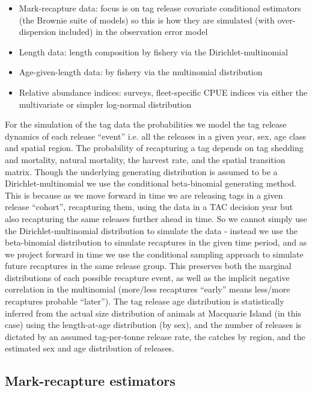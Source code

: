 \documentclass[12pt,a4paper,twoside,times,sky,standard]{csiroreport2017}
\begin{document}
\begin{itemize}
    \item Mark-recapture data: focus is on tag release covariate conditional estimators (the Brownie suite of models) so this is how they are simulated (with over-dispersion included) in the observation error model
    \item Length data: length composition by fishery via the Dirichlet-multinomial
    \item Age-given-length data: by fishery via the multinomial distribution
    \item Relative abundance indices: surveys, fleet-specific CPUE indices via either the multivariate or simpler log-normal distribution
\end{itemize}

For the simulation of the tag data the probabilities we model the tag release dynamics of each release ``event'' i.e. all the releases in a given year, sex, age class and spatial region. The probability of recapturing a tag depends on tag shedding and mortality, natural mortality, the harvest rate, and the spatial transition matrix. Though the underlying generating distribution is assumed to be a Dirichlet-multinomial we use the conditional beta-binomial generating method. This is because as we move forward in time we are releasing tags in a given release ``cohort'', recapturing them, using the data in a TAC decision year but also recapturing the same releases further ahead in time. So we cannot simply use the Dirichlet-multinomial distribution to simulate the data - instead we use the beta-binomial distribution to simulate recaptures in the given time period, and as we project forward in time we use the conditional sampling approach to simulate future recaptures in the same release group. This preserves both the marginal distributions of each possible recapture event, as well as the implicit negative correlation in the multinomial (more/less recaptures ``early'' means less/more recaptures probable ``later''). The tag release age distribution is statistically inferred from the actual size distribution of animals at Macquarie Island (in this case) using the length-at-age distribution (by sex), and the number of releases is dictated by an assumed tag-per-tonne release rate, the catches by region, and the estimated sex and age distribution of releases.

\subsection{Mark-recapture estimators}
\end{document}

